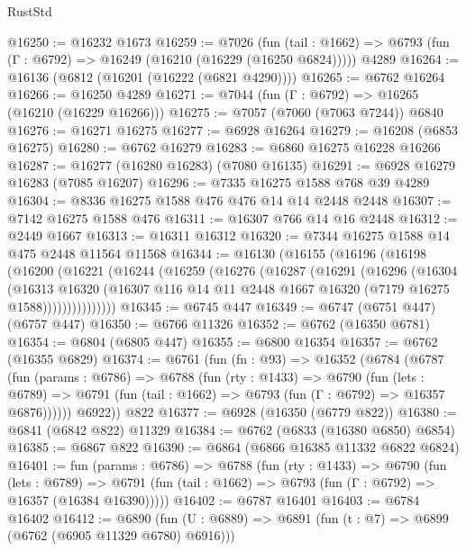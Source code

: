 \begin{lexlean}{RustStd}
\begin{coremodule}
@16250 := @16232 @1673
@16259 := @7026
    (fun (tail : @1662) => @6793 (fun (Γ : @6792) => @16249 (@16210 (@16229 (@16250 @6824)))))
    @4289
@16264 := @16136 (@6812 (@16201 (@16222 (@6821 @4290))))
@16265 := @6762 @16264
@16266 := @16250 @4289
@16271 := @7044 (fun (Γ : @6792) => @16265 (@16210 (@16229 @16266)))
@16275 := @7057 (@7060 (@7063 @7244)) @6840
@16276 := @16271 @16275
@16277 := @6928 @16264
@16279 := @16208 (@6853 @16275)
@16280 := @6762 @16279
@16283 := @6860 @16275 @16228 @16266
@16287 := @16277 (@16280 @16283) (@7080 @16135)
@16291 := @6928 @16279 @16283 (@7085 @16207)
@16296 := @7335 @16275 @1588 @768 @39 @4289
@16304 := @8336 @16275 @1588 @476 @476 @14 @14 @2448 @2448
@16307 := @7142 @16275 @1588 @476
@16311 := @16307 @766 @14 @16 @2448
@16312 := @2449 @1667
@16313 := @16311 @16312
@16320 := @7344 @16275 @1588 @14 @475 @2448 @11564 @11568
@16344 := @16130
    (@16155
      (@16196
        (@16198
          (@16200
            (@16221
              (@16244
                (@16259
                  (@16276
                    (@16287
                      (@16291
                        (@16296
                          (@16304
                            (@16313
                              @16320
                              (@16307
                                @116
                                @14
                                @11
                                @2448
                                @1667
                                @16320
                                (@7179 @16275 @1588)))))))))))))))
@16345 := @6745 @447
@16349 := @6747 (@6751 @447) (@6757 @447)
@16350 := @6766 @11326
@16352 := @6762 (@16350 @6781)
@16354 := @6804 (@6805 @447)
@16355 := @6800 @16354
@16357 := @6762 (@16355 @6829)
@16374 := @6761
    (fun (fn : @93) =>
    @16352
      (@6784
        (@6787
          (fun (params : @6786) =>
          @6788
            (fun (rty : @1433) =>
            @6790
              (fun (lets : @6789) =>
              @6791 (fun (tail : @1662) => @6793 (fun (Γ : @6792) => @16357 @6876))))))
        @6922))
    @822
@16377 := @6928 (@16350 (@6779 @822))
@16380 := @6841 (@6842 @822) @11329
@16384 := @6762 (@6833 (@16380 @6850) @6854)
@16385 := @6867 @822
@16390 := @6864 (@6866 @16385 @11332 @6822 @6824)
@16401 := fun (params : @6786) =>
  @6788
    (fun (rty : @1433) =>
    @6790
      (fun (lets : @6789) =>
      @6791 (fun (tail : @1662) => @6793 (fun (Γ : @6792) => @16357 (@16384 @16390)))))
@16402 := @6787 @16401
@16403 := @6784 @16402
@16412 := @6890
    (fun (U : @6889) => @6891 (fun (t : @7) => @6899 (@6762 (@6905 @11329 @6780) @6916)))

\end{coremodule}
\end{lexlean}

